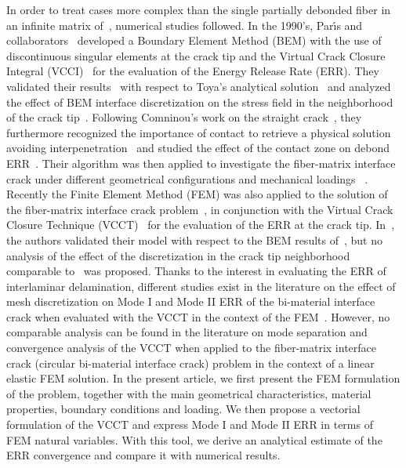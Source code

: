 In order to treat cases more complex than the single partially debonded fiber in an infinite matrix of~\cite{England1966,Perlman1967,Toya1974}, numerical studies followed. In the 1990's, Par{\'{\i}}s and collaborators~\cite{Paris1996} developed a Boundary Element Method (BEM) with the use of discontinuous singular elements at the crack tip and the Virtual Crack Closure Integral (VCCI)~\cite{Irwin1958} for the evaluation of the Energy Release Rate (ERR). They validated their results~\cite{Paris1996} with respect to Toya's analytical solution~\cite{Toya1974} and analyzed the effect of BEM interface discretization on the stress field in the neighborhood of the crack tip~\cite{DelCano1997}. Following Comninou's work on the straight crack~\cite{Comninou1977}, they furthermore recognized the importance of contact to retrieve a physical solution avoiding interpenetration~\cite{Paris1996} and studied the effect of the contact zone on debond ERR~\cite{Varna1997a}. Their algorithm was then applied to investigate the fiber-matrix interface crack under different geometrical configurations and mechanical loadings ~\cite{Paris2007,Correa2007,Correa2011,Correa2013,Correa2014,Sandino2016,Sandino2018}.\\
Recently the Finite Element Method (FEM) was also applied to the solution of the fiber-matrix interface crack problem~\cite{Zhuang2018,Varna2017,Zhuang2018a}, in conjunction with the Virtual Crack Closure Technique (VCCT)~\cite{Rybicki1977,Krueger2004} for the evaluation of the ERR at the crack tip. In~\cite{Zhuang2018}, the authors validated their model with respect to the BEM results of~\cite{Paris1996}, but no analysis of the effect of the discretization in the crack tip neighborhood comparable to~\cite{DelCano1997} was proposed. Thanks to the interest in evaluating the ERR of interlaminar delamination, different studies exist in the literature on the effect of mesh discretization on Mode I and Mode II ERR of the bi-material interface crack when evaluated with the VCCT in the context of the FEM~\cite{Sun1987,Manoharan1990,Sun1997}. However, no comparable analysis can be found in the literature on mode separation and convergence analysis of the VCCT when applied to the fiber-matrix interface crack (circular bi-material interface crack) problem in the context of a linear elastic FEM solution. In the present article, we first present the FEM formulation of the problem, together with the main geometrical characteristics, material properties, boundary conditions and loading. We then propose a vectorial formulation of the VCCT and express Mode I and Mode II ERR in terms of FEM natural variables. With this tool, we derive an analytical estimate of the ERR convergence and compare it with numerical results.

